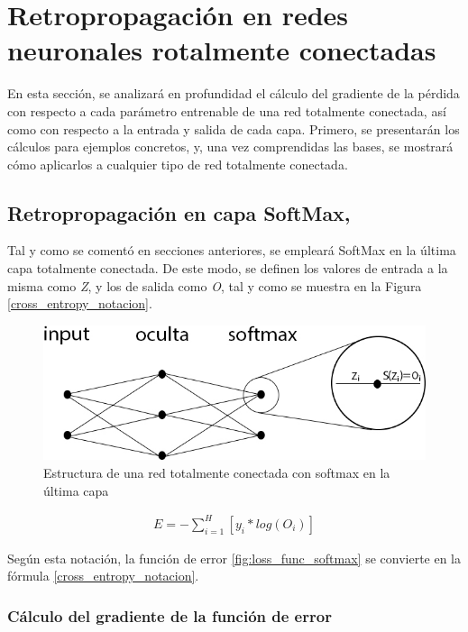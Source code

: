 \section{Retropropagación en redes neuronales rotalmente conectadas}

En esta sección, se analizará en profundidad el cálculo del gradiente de la pérdida con respecto a cada parámetro entrenable de una red totalmente conectada, así como con respecto a la entrada y salida de cada capa. Primero, se presentarán los cálculos para ejemplos concretos, y, una vez comprendidas las bases, se mostrará cómo aplicarlos a cualquier tipo de red totalmente conectada.

\subsection{Retropropagación en capa SoftMax, \cite{Cross_entropy_backprop} \cite{Cross_entropy_backprop_grad_input}} 

Tal y como se comentó en secciones anteriores, se empleará SoftMax en la última capa totalmente conectada. De este modo, se definen los valores de entrada a la misma como \textit{Z}, y los de salida como \textit{O}, tal y como se muestra en la Figura \ref{cross_entropy_notacion}.

\begin{figure}[H]
	\centering
	\includegraphics[scale=0.4]{imagenes/NN_softmax.jpg}  
	\caption{Estructura de una red totalmente conectada con softmax en la última capa}
\end{figure}

\begin{gather}
	E = - \sum_{i=1}^{H}  [y_i * log(O_i)] 
	\label{cross_entropy_notacion}
\end{gather}

Según esta notación, la función de error \ref{fig:loss_func_softmax} se convierte en la fórmula \ref{cross_entropy_notacion}.

\subsubsection{Cálculo del gradiente de la función de error}

